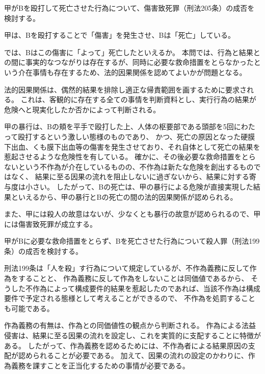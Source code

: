 \documentclass[11pt]{jsarticle}
\title{\vspace{-30mm}{\textgt{\Large{\fbox{3} ヒモ生活の果てに}}}}
\date{\vspace{-15mm}}
\begin{document}
\maketitle


	\sectionB{}
	甲がBを殴打して死亡させた行為について、傷害致死罪（刑法205条）の成否を検討する。
	
		\sectionC{}
		甲は、Bを殴打することで「傷害」を発生させ、Bは「死亡」している。
		
		\sectionC{}
		では、Bはこの傷害に「よって」死亡したといえるか。
		本問では、行為と結果との間に事実的なつながりは存在するが、同時に必要な救命措置をとらなかったという介在事情も存在するため、法的因果関係を認めてよいかが問題となる。
		
		法的因果関係は、偶然的結果を排除し適正な帰責範囲を画するために要求される。
		これは、客観的に存在する全ての事情を判断資料とし、実行行為の結果が危険へと現実化したか否かによって判断される。
		
		甲の暴行は、Bの頬を平手で殴打した上、人体の枢要部である頭部を5回にわたって殴打するという激しい態様のものであり、
		かつ、死亡の原因となった硬膜下出血、くも膜下出血等の傷害を発生させており、それ自体として死亡の結果を惹起させるような危険性を有している。
		確かに、その後必要な救命措置をとらないという不作為が介在しているものの、不作為は新たな危険を創出するものではなく、
		結果に至る因果の流れを阻止しないに過ぎないから、結果に対する寄与度は小さい。
		したがって、Bの死亡は、甲の暴行による危険が直接実現した結果といえるから、甲の暴行とBの死亡の間の法的因果関係が認められる。
		
		\sectionC{}
		また、甲には殺人の故意はないが、少なくとも暴行の故意が認められるので、甲には傷害致死罪が成立する。
	
	\sectionB{}
	甲がBに必要な救命措置をとらず、Bを死亡させた行為について殺人罪（刑法199条）の成否を検討する。
	
		\sectionC{}
		刑法199条は「人を殺」す行為について規定しているが、不作為義務に反して作為をすることと、
		作為義務に反して作為をしないことは同価値であるから、
		そうした不作為によって構成要件的結果を惹起したのであれば、当該不作為は構成要件で予定される態様として考えることができるので、
		不作為を処罰することも可能である。
		
		作為義務の有無は、作為との同価値性の観点から判断される。
		作為による法益侵害は、結果に至る因果の流れを設定し、これを実質的に支配することに特徴がある。
		したがって、作為義務を認めるためには、不作為者による結果原因の支配が認められることが必要である。
		加えて、因果の流れの設定のかわりに、作為義務を課すことを正当化するための事情が必要である。
		
\end{document}
